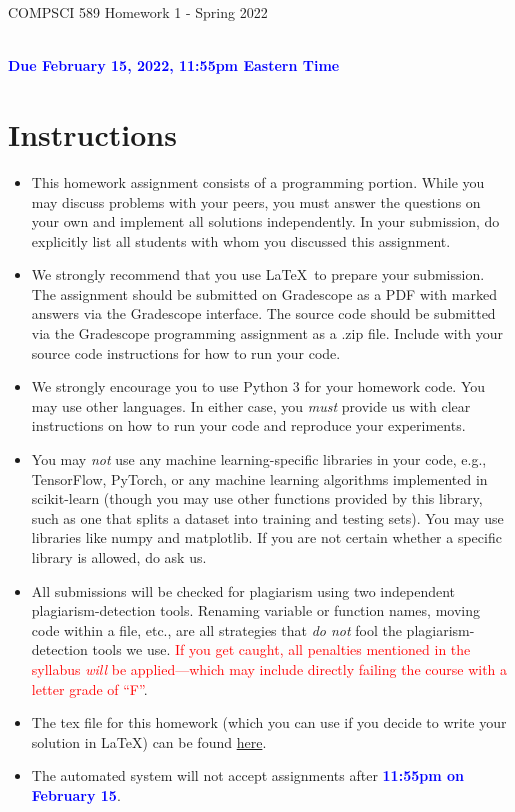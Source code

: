 \documentclass[]{article}
\newcommand{\HIGHLIGHT}[1]{\textcolor{blue}{\textbf{#1}}}
\begin{document}
\newpage
\begin{center}
    \begin{Large}
    COMPSCI 589 Homework 1 - Spring 2022
    \end{Large}
    \\
    \HIGHLIGHT{Due February 15, 2022, 11:55pm Eastern Time}
\end{center}



\vspace{0.25in}
\section{Instructions}

\begin{itemize}
    \item This homework assignment consists of a programming portion. While you may discuss problems with your peers, you must answer the questions on your own and implement all solutions independently. In your submission, do explicitly list all students with whom you discussed this assignment. 
    \item We strongly recommend that you use \LaTeX~to prepare your submission. The assignment should be submitted on Gradescope as a PDF with marked answers via the Gradescope interface. The source code should be submitted via the Gradescope programming assignment as a .zip file. Include with your source code instructions for how to run your code. 
    \item We strongly encourage you to use Python 3 for your homework code. You may use other languages. In either case, you \textit{must} provide us with clear instructions on how to run your code and reproduce your experiments. 
    \item You may \textit{not} use any machine learning-specific libraries in your code, e.g., TensorFlow, PyTorch, or any machine learning algorithms implemented in scikit-learn (though you may use other functions provided by this library, such as one that splits a dataset into training and testing sets). You may use libraries like numpy and matplotlib. If you are not certain whether a specific library is allowed, do ask us.
    \item All submissions will be checked for plagiarism using two independent plagiarism-detection tools. Renaming variable or function names, moving code within a file, etc., are all strategies that \textit{do not} fool the plagiarism-detection tools we use. \textcolor{red}{If you get caught, all penalties mentioned in the syllabus \textit{will} be applied---which may include directly failing the course with a letter grade of ``F''}.
    \item The tex file for this homework (which you can use if you decide to write your solution in \LaTeX) can be found \href{https://people.cs.umass.edu/~bsilva/courses/CMPSCI_589/Spring2022/homeworks/hw1.zip}{here}.
    \item The automated system will not accept assignments after \HIGHLIGHT{11:55pm on February 15}. 
\end{itemize}
\end{document}
